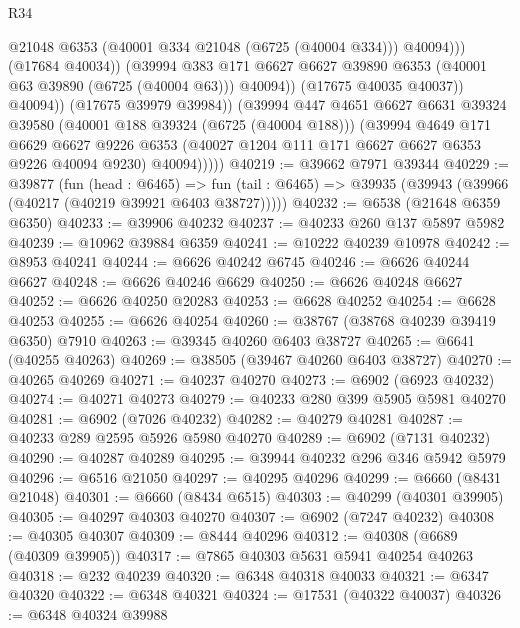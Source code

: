 \begin{lexlean}{R34}
\begin{coremodule}
                            @21048
                            @6353
                            (@40001 @334 @21048 (@6725 (@40004 @334)))
                            @40094)))
                      (@17684 @40034))
                    (@39994
                      @383
                      @171
                      @6627
                      @6627
                      @39890
                      @6353
                      (@40001 @63 @39890 (@6725 (@40004 @63)))
                      @40094))
                  (@17675 @40035 @40037))
                @40094))
            (@17675 @39979 @39984))
          (@39994
            @447
            @4651
            @6627
            @6631
            @39324
            @39580
            (@40001 @188 @39324 (@6725 (@40004 @188)))
            (@39994
              @4649
              @171
              @6629
              @6627
              @9226
              @6353
              (@40027 @1204 @111 @171 @6627 @6627 @6353 @9226 @40094 @9230)
              @40094)))))
@40219 := @39662 @7971 @39344
@40229 := @39877
    (fun (head : @6465) =>
    fun (tail : @6465) => @39935 (@39943 (@39966 (@40217 (@40219 @39921 @6403 @38727)))))
@40232 := @6538 (@21648 @6359 @6350)
@40233 := @39906 @40232
@40237 := @40233 @260 @137 @5897 @5982
@40239 := @10962 @39884 @6359
@40241 := @10222 @40239 @10978
@40242 := @8953 @40241
@40244 := @6626 @40242 @6745
@40246 := @6626 @40244 @6627
@40248 := @6626 @40246 @6629
@40250 := @6626 @40248 @6627
@40252 := @6626 @40250 @20283
@40253 := @6628 @40252
@40254 := @6628 @40253
@40255 := @6626 @40254
@40260 := @38767 (@38768 @40239 @39419 @6350) @7910
@40263 := @39345 @40260 @6403 @38727
@40265 := @6641 (@40255 @40263)
@40269 := @38505 (@39467 @40260 @6403 @38727)
@40270 := @40265 @40269
@40271 := @40237 @40270
@40273 := @6902 (@6923 @40232)
@40274 := @40271 @40273
@40279 := @40233 @280 @399 @5905 @5981 @40270
@40281 := @6902 (@7026 @40232)
@40282 := @40279 @40281
@40287 := @40233 @289 @2595 @5926 @5980 @40270
@40289 := @6902 (@7131 @40232)
@40290 := @40287 @40289
@40295 := @39944 @40232 @296 @346 @5942 @5979
@40296 := @6516 @21050
@40297 := @40295 @40296
@40299 := @6660 (@8431 @21048)
@40301 := @6660 (@8434 @6515)
@40303 := @40299 (@40301 @39905)
@40305 := @40297 @40303 @40270
@40307 := @6902 (@7247 @40232)
@40308 := @40305 @40307
@40309 := @8444 @40296
@40312 := @40308 (@6689 (@40309 @39905))
@40317 := @7865 @40303 @5631 @5941 @40254 @40263
@40318 := @232 @40239
@40320 := @6348 @40318 @40033
@40321 := @6347 @40320
@40322 := @6348 @40321
@40324 := @17531 (@40322 @40037)
@40326 := @6348 @40324 @39988

\end{coremodule}
\end{lexlean}
